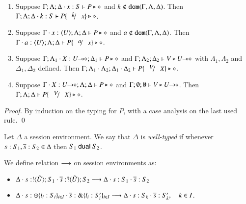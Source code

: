 \begin{lemma}\rm
	\begin{enumerate}[1.]
		\item	Suppose $\Gamma; \Lambda; \Delta \cdot x:S  \vdash P \triangleright \diamond$ and
			$k \not\in \mathtt{dom}(\Gamma, \Lambda, \Delta)$. 
			Then $\Gamma; \Lambda; \Delta \cat k:S  \vdash P\subst{k}{x} \hastype \Proc$.

		\item	Suppose $\Gamma \cdot x:\langle U \rangle; \Lambda; \Delta \vdash P \triangleright \diamond$ and
			$a \notin \mathtt{dom}(\Gamma, \Lambda, \Delta)$. 
			Then $\Gamma \cat a:\chtype{U}; \Lambda; \Delta   \vdash P\subst{a}{x} \hastype \Proc$.

		\item	Suppose $\Gamma; \Lambda_1 \cdot X:U\!\! \multimap\!\! \diamond; \Delta_1  \vdash P \triangleright \diamond$ 
			and $\Gamma; \Lambda_2; \Delta_2  \vdash V \triangleright U\!\! \multimap\!\! \diamond$ with 
			$\Lambda_1, \Lambda_2$ and $\Delta_1, \Delta_2$ defined.  
			Then $\Gamma; \Lambda_1 \cat \Lambda_2; \Delta_1 \cat \Delta_2  \proves P\subst{V}{X} \hastype \Proc$.

		\item	Suppose $\Gamma \cdot X:U\!\! \rightarrow\!\! \diamond; \Lambda; \Delta  \vdash P \triangleright \diamond$ and
			$\Gamma; \emptyset ; \emptyset  \vdash V \triangleright U\!\! \rightarrow\!\! \diamond$.
			Then $\Gamma; \Lambda; \Delta  \proves P\subst{V}{X} \hastype \Proc$.
		\end{enumerate}
\end{lemma}

\begin{proof}
By induction on the typing for $P$, with a case analysis on the last used rule. 
\qed
\end{proof}

\begin{definition}\rm
	Let $\Delta$ a session environment.
	We say that $\Delta$ is {\em well-typed} if whenever
	$s: S_1, \overline{s}: S_2 \in \Delta$ then $S_1 \ \mathsf{dual}\  S_2$.
\end{definition}

\begin{definition}\rm
	We define relation $\longrightarrow$ on session environments as:
	\begin{itemize}
		\item	$\Delta \cdot s: ! \langle \tilde{U} \rangle ; S_1 \cdot \overline{s}: ? (\tilde{U}) ; S_2 \longrightarrow \Delta \cdot s: S_1 \cdot \overline{s}: S_2$
		\item	$\Delta \cdot s: \oplus \{l_i: S_i\}_{i \in I} \cdot \overline{s}: \& \{l_i: S_i'\}_{i \in I} \longrightarrow \Delta \cdot s: S_k \cdot \overline{s}: S_k', \quad k \in I$.
	\end{itemize}
\end{definition}

